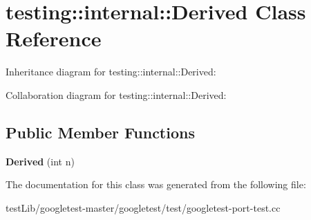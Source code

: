 \hypertarget{classtesting_1_1internal_1_1Derived}{}\section{testing\+:\+:internal\+:\+:Derived Class Reference}
\label{classtesting_1_1internal_1_1Derived}


Inheritance diagram for testing\+:\+:internal\+:\+:Derived\+:


Collaboration diagram for testing\+:\+:internal\+:\+:Derived\+:
\subsection*{Public Member Functions}
\begin{DoxyCompactItemize}
\item 
\mbox{\label{classtesting_1_1internal_1_1Derived_a05a8e8354c7c09a9f3728a96c96f1edd}} 
{\bfseries Derived} (int n)
\end{DoxyCompactItemize}


The documentation for this class was generated from the following file\+:\begin{DoxyCompactItemize}
\item 
test\+Lib/googletest-\/master/googletest/test/googletest-\/port-\/test.\+cc\end{DoxyCompactItemize}
